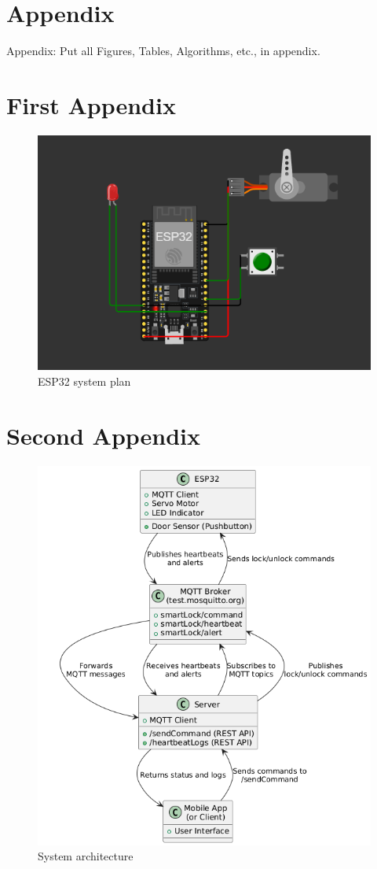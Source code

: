 \section*{Appendix}
\appendix
Appendix: Put all Figures, Tables, Algorithms, etc., in appendix.

\section{First Appendix}
\label{app:FirstAppendix}

\begin{figure}[tbh]
\includegraphics[width=.45\textwidth]{Images/esp32.png}
\caption{ESP32 system plan}
\label{app:fig:SDULogo}
\end{figure}

\section{Second Appendix}
\label{app:SecondAppendix}

\begin{figure}[tbh]
\includegraphics[width=.95\textwidth]{Images/system-architecture.png}
\caption{System architecture}
\label{app:fig:SDULogoV2}
\end{figure}